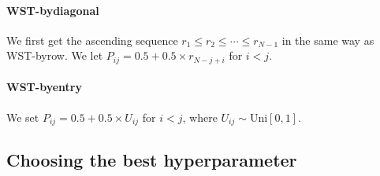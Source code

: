 \paragraph{WST-bydiagonal} We first get the ascending sequence $r_1 \leq r_2 \leq \cdots \leq r_{N-1} $ in the same way as WST-byrow. We let $P_{ij}=0.5+0.5 \times r_{N-j+i}$ for $i<j$.

\paragraph{WST-byentry} 
We set $P_{ij}=0.5+0.5 \times U_{ij}$ for $i<j$, where $U_{ij}\sim \text{Uni}[0,1]$.







\subsection{Choosing the best hyperparameter}

